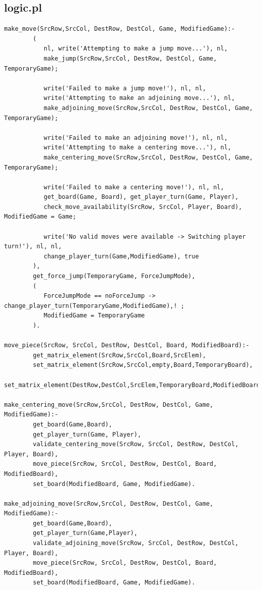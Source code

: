 \documentclass[a4paper]{article}
\begin{document}
\subsection{logic.pl}
\begin{lstlisting}[style=customprologwithlines]
% attempt to make a move
make_move(SrcRow,SrcCol, DestRow, DestCol, Game, ModifiedGame):-
        (       
           nl, write('Attempting to make a jump move...'), nl,
           make_jump(SrcRow,SrcCol, DestRow, DestCol, Game, TemporaryGame);

           write('Failed to make a jump move!'), nl, nl,
           write('Attempting to make an adjoining move...'), nl,
           make_adjoining_move(SrcRow,SrcCol, DestRow, DestCol, Game, TemporaryGame);

           write('Failed to make an adjoining move!'), nl, nl,
           write('Attempting to make a centering move...'), nl,
           make_centering_move(SrcRow,SrcCol, DestRow, DestCol, Game, TemporaryGame);

           write('Failed to make a centering move!'), nl, nl,
           get_board(Game, Board), get_player_turn(Game, Player),
           check_move_availability(SrcRow, SrcCol, Player, Board), ModifiedGame = Game;

           write('No valid moves were available -> Switching player turn!'), nl, nl,
           change_player_turn(Game,ModifiedGame), true
        ),
        get_force_jump(TemporaryGame, ForceJumpMode),
        (
           ForceJumpMode == noForceJump -> change_player_turn(TemporaryGame,ModifiedGame),! ;
           ModifiedGame = TemporaryGame
        ).

move_piece(SrcRow, SrcCol, DestRow, DestCol, Board, ModifiedBoard):-
        get_matrix_element(SrcRow,SrcCol,Board,SrcElem),
        set_matrix_element(SrcRow,SrcCol,empty,Board,TemporaryBoard),
        set_matrix_element(DestRow,DestCol,SrcElem,TemporaryBoard,ModifiedBoard).

make_centering_move(SrcRow,SrcCol, DestRow, DestCol, Game, ModifiedGame):-
        get_board(Game,Board),
        get_player_turn(Game, Player),
        validate_centering_move(SrcRow, SrcCol, DestRow, DestCol, Player, Board),
        move_piece(SrcRow, SrcCol, DestRow, DestCol, Board, ModifiedBoard),
        set_board(ModifiedBoard, Game, ModifiedGame).

make_adjoining_move(SrcRow,SrcCol, DestRow, DestCol, Game, ModifiedGame):-
        get_board(Game,Board), 
        get_player_turn(Game,Player),
        validate_adjoining_move(SrcRow, SrcCol, DestRow, DestCol, Player, Board),
        move_piece(SrcRow, SrcCol, DestRow, DestCol, Board, ModifiedBoard),
        set_board(ModifiedBoard, Game, ModifiedGame).


\end{lstlisting}
\end{document}
